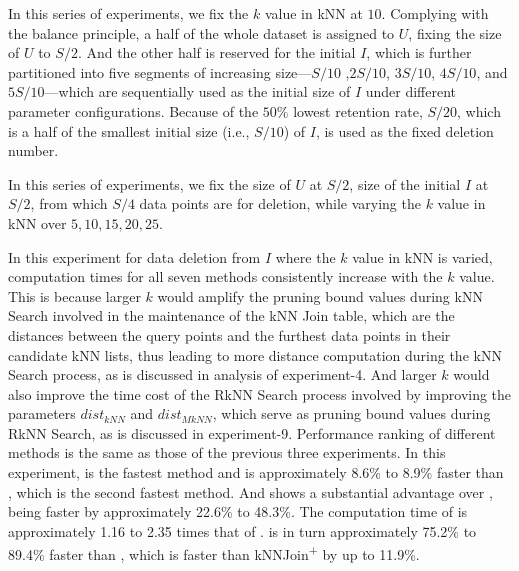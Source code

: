  In this series of experiments, we fix the $k$ value in kNN at $10$. Complying with the balance principle, a half of the whole dataset is assigned to $U$, fixing the size of $U$ to $S/2$. And the other half is reserved for the initial $I$, which is further partitioned into five segments of increasing size—$S/10$ ,$2S/10$, $3S/10$, $4S/10$, and $5S/10$—which are sequentially used as the initial size of $I$ under different parameter configurations. Because of the $50\%$ lowest retention rate, $S/20$, which is a half of the smallest initial size (i.e., $S/10$) of $I$, is used as the fixed deletion number. 

 In this series of experiments, we fix the size of $U$ at $S/2$, size of the initial $I$ at $S/2$, from which $S/4$ data points are for deletion, while varying the $k$ value in kNN over ${5, 10, 15, 20, 25}$.

In this experiment for data deletion from $I$ where the $k$ value in kNN is varied, computation times for all seven methods consistently increase with the $k$ value. This is because larger $k$ would amplify the pruning bound values during kNN Search involved in the maintenance of the kNN Join table, which are the distances between the query points and the furthest data points in their candidate kNN lists, thus leading to more distance computation during the kNN Search process, as is discussed in analysis of experiment-4. And larger $k$ would also improve the time cost of the RkNN Search process involved by improving the parameters $dist_{kNN}$ and $dist_{MkNN}$, which serve as pruning bound values during RkNN Search, as is discussed in experiment-9. Performance ranking of different methods is the same as those of the previous three experiments. 
In this experiment, \cpdualtree is the fastest method and is approximately 8.6\% to 8.9\% faster than \spdualtree, which is the second fastest method. And \spdualtree shows a substantial advantage over \dualtree, being faster by approximately 22.6\% to 48.3\%. The computation time of \deltatree is approximately 1.16 to 2.35 times that of \dualtree. \deltatree is in turn approximately 75.2\% to 89.4\% faster than \hdrtree, which is faster than kNNJoin\textsuperscript{+} by up to 11.9\%.

